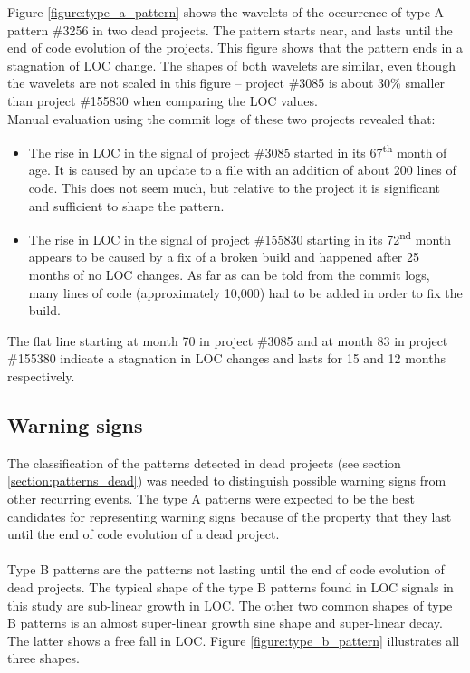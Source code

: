 

\indent
Figure \ref{figure:type_a_pattern} shows the wavelets of the occurrence of type
A pattern \#3256 in two dead projects. The pattern starts near, and lasts until
the end of code evolution of the projects. This figure shows that the pattern
ends in a stagnation of LOC change. The shapes of both wavelets are similar,
even though the wavelets are not scaled in this figure -- project \#3085 is
about 30\% smaller than project \#155830 when comparing the LOC values.\\

\noindent
Manual evaluation using the commit logs of these two projects revealed that:

\begin{itemize}
	\item The rise in LOC in the signal of project \#3085 started in its
		67\textsuperscript{th} month of age. It is caused by an update to a file
		with an addition of about 200 lines of code. This does not seem much, but
		relative to the project it is significant and sufficient to shape the
		pattern.

	\item The rise in LOC in the signal of project \#155830 starting in its
		72\textsuperscript{nd} month appears to be caused by a fix of a broken build
		and happened after 25 months of no LOC changes. As far as can be told from
		the commit logs, many lines of code (approximately 10,000) had to be added in
		order to fix the build.
\end{itemize}

\noindent
The flat line starting at month 70 in project \#3085 and at month 83 in project
\#155380 indicate a stagnation in LOC changes and lasts for 15 and 12 months
respectively.

\subsection{Warning signs}
The classification of the patterns detected in dead projects (see section
\ref{section:patterns_dead}) was needed to distinguish possible warning signs
from other recurring events. The type A patterns were expected to be the best
candidates for representing warning signs because of the property that they
last until the end of code evolution of a dead project.

\paragraph{}
Type B patterns are the patterns not lasting until the end of code evolution of
dead projects. The typical shape of the type B patterns found in LOC signals in
this study are sub-linear growth in LOC. The other two common shapes of type B
patterns is an almost super-linear growth sine shape and super-linear decay.
The latter shows a free fall in LOC. Figure \ref{figure:type_b_pattern}
illustrates all three shapes.

